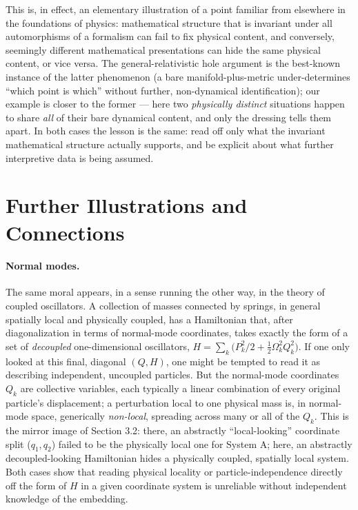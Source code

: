 \documentclass[11pt]{article}
\begin{document}
This is, in effect, an elementary illustration of a point familiar from elsewhere in the foundations of physics: mathematical structure that is invariant under all automorphisms of a formalism can fail to fix physical content, and conversely, seemingly different mathematical presentations can hide the same physical content, or vice versa. The general-relativistic hole argument \cite{EarmanNorton1987} is the best-known instance of the latter phenomenon (a bare manifold-plus-metric under-determines ``which point is which'' without further, non-dynamical identification); our example is closer to the former --- here two \emph{physically distinct} situations happen to share \emph{all} of their bare dynamical content, and only the dressing tells them apart. In both cases the lesson is the same: read off only what the invariant mathematical structure actually supports, and be explicit about what further interpretive data is being assumed.

\section{Further Illustrations and Connections}

\paragraph{Normal modes.} The same moral appears, in a sense running the other way, in the theory of coupled oscillators. A collection of masses connected by springs, in general spatially local and physically coupled, has a Hamiltonian that, after diagonalization in terms of normal-mode coordinates, takes exactly the form of a set of \emph{decoupled} one-dimensional oscillators, $H=\sum_k \big(P_k^2/2+\frac12\Omega_k^2 Q_k^2\big)$. If one only looked at this final, diagonal $(Q,H)$, one might be tempted to read it as describing independent, uncoupled particles. But the normal-mode coordinates $Q_k$ are collective variables, each typically a linear combination of every original particle's displacement; a perturbation local to one physical mass is, in normal-mode space, generically \emph{non-local}, spreading across many or all of the $Q_k$. This is the mirror image of Section 3.2: there, an abstractly ``local-looking'' coordinate split ($q_1,q_2$) failed to be the physically local one for System A; here, an abstractly decoupled-looking Hamiltonian hides a physically coupled, spatially local system. Both cases show that reading physical locality or particle-independence directly off the form of $H$ in a given coordinate system is unreliable without independent knowledge of the embedding.
\end{document}
